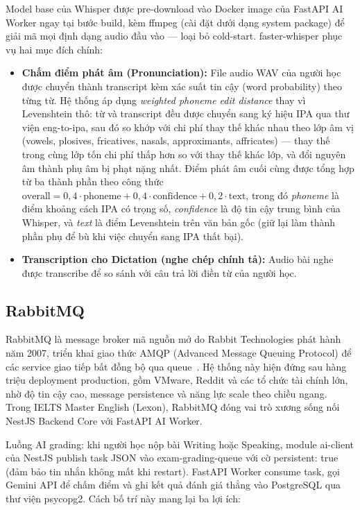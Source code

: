 Model base của Whisper được pre-download vào Docker image của FastAPI AI Worker ngay tại bước build, kèm ffmpeg (cài đặt dưới dạng system package) để giải mã mọi định dạng audio đầu vào --- loại bỏ cold-start. faster-whisper phục vụ hai mục đích chính:

\begin{itemize}
    \item \textbf{Chấm điểm phát âm (Pronunciation):} File audio WAV của người học được chuyển thành transcript kèm xác suất tin cậy (word probability) theo từng từ. Hệ thống áp dụng \textit{weighted phoneme edit distance} thay vì Levenshtein thô: từ và transcript đều được chuyển sang ký hiệu IPA qua thư viện eng-to-ipa, sau đó so khớp với chi phí thay thế khác nhau theo lớp âm vị (vowels, plosives, fricatives, nasals, approximants, affricates) --- thay thế trong cùng lớp tốn chi phí thấp hơn so với thay thế khác lớp, và đổi nguyên âm thành phụ âm bị phạt nặng nhất. Điểm phát âm cuối cùng được tổng hợp từ ba thành phần theo công thức $\text{overall} = 0{,}4 \cdot \text{phoneme} + 0{,}4 \cdot \text{confidence} + 0{,}2 \cdot \text{text}$, trong đó \textit{phoneme} là điểm khoảng cách IPA có trọng số, \textit{confidence} là độ tin cậy trung bình của Whisper, và \textit{text} là điểm Levenshtein trên văn bản gốc (giữ lại làm thành phần phụ để bù khi việc chuyển sang IPA thất bại).
    \item \textbf{Transcription cho Dictation (nghe chép chính tả):} Audio bài nghe được transcribe để so sánh với câu trả lời điền từ của người học.
\end{itemize}

\subsection{RabbitMQ}

RabbitMQ là message broker mã nguồn mở do Rabbit Technologies phát hành năm 2007, triển khai giao thức AMQP (Advanced Message Queuing Protocol) để các service giao tiếp bất đồng bộ qua queue~\cite{rabbitmq-docs}. Hệ thống này hiện đứng sau hàng triệu deployment production, gồm VMware, Reddit và các tổ chức tài chính lớn, nhờ độ tin cậy cao, message persistence và năng lực scale theo chiều ngang. Trong IELTS Master English (Lexon), RabbitMQ đóng vai trò xương sống nối NestJS Backend Core với FastAPI AI Worker.

Luồng AI grading: khi người học nộp bài Writing hoặc Speaking, module ai-client của NestJS publish task JSON vào exam-grading-queue với cờ persistent: true (đảm bảo tin nhắn không mất khi restart). FastAPI Worker consume task, gọi Gemini API để chấm điểm và ghi kết quả đánh giá thẳng vào PostgreSQL qua thư viện psycopg2. Cách bố trí này mang lại ba lợi ích:

